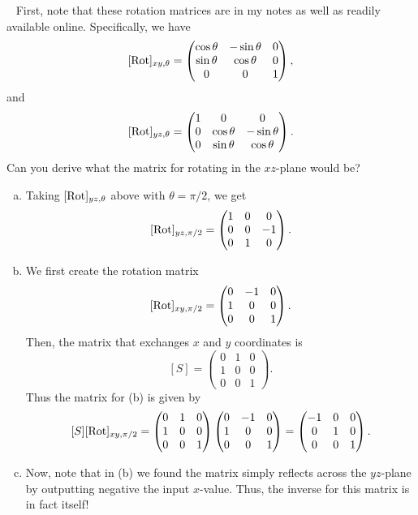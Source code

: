 \documentclass[12pt]{article} %
\begin{document}
\begin{solution}~
First, note that these rotation matrices are in my notes as well as readily available online. Specifically, we have
\[
[\mathrm{Rot}]_{xy,\theta} = \begin{pmatrix} \cos \theta & -\sin \theta & 0 \\ \sin \theta & \cos \theta & 0 \\ 0 & 0 & 1 \end{pmatrix},
\]
and
\[
[\mathrm{Rot}]_{yz,\theta} = \begin{pmatrix} 1 & 0 & 0 \\ 0 & \cos \theta & -\sin \theta \\ 0 & \sin \theta & \cos \theta \end{pmatrix}.
\]
Can you derive what the matrix for rotating in the $xz$-plane would be?
\begin{enumerate}[(a)]
    \item Taking $[\mathrm{Rot}]_{yz,\theta}$ above with $\theta=\pi/2$, we get
    \[
    [\mathrm{Rot}]_{yz,\pi/2} = \begin{pmatrix} 1 & 0 & 0 \\ 0 & 0 & -1 \\ 0 & 1 & 0 \end{pmatrix}.
    \]
    \item We first create the rotation matrix 
    \[
    [\mathrm{Rot}]_{xy,\pi/2} = \begin{pmatrix} 0 & -1 & 0 \\ 1 & 0 & 0 \\ 0 & 0 & 1 \end{pmatrix}.
    \]
    Then, the matrix that exchanges $x$ and $y$ coordinates is
    \[
    [S]=\begin{pmatrix} 0 & 1 & 0 \\ 1 & 0 & 0 \\ 0 & 0 & 1 \end{pmatrix}.
    \]
    Thus the matrix for (b) is given by
    \[
    [S][\mathrm{Rot}]_{xy,\pi/2} = \begin{pmatrix} 0 & 1 & 0 \\ 1 & 0 & 0 \\ 0 & 0 & 1 \end{pmatrix}\begin{pmatrix} 0 & -1 & 0 \\ 1 & 0 & 0 \\ 0 & 0 & 1 \end{pmatrix} = \begin{pmatrix} -1 & 0 & 0 \\ 0 & 1 & 0 \\ 0 & 0 & 1 \end{pmatrix}.
    \]
    \item Now, note that in (b) we found the matrix simply reflects across the $yz$-plane by outputting negative the input $x$-value. Thus, the inverse for this matrix is in fact itself!
\end{enumerate}
\end{solution}
\end{document}
